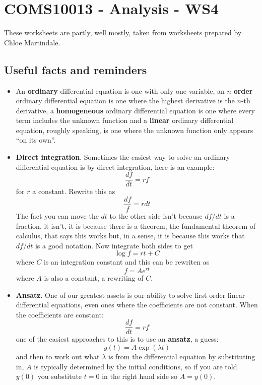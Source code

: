 \documentclass[11pt,a4paper]{scrartcl}
\begin{document}
\section*{COMS10013 - Analysis - WS4}

These worksheets are partly, well mostly, taken from worksheets prepared by Chloe Martindale.

\subsection*{Useful facts and reminders}

\begin{itemize}
\item An \textbf{ordinary} differential equation is one with only one variable,
  an $n$-\textbf{order} ordinary differential equation is one where the highest
  derivative is the $n$-th derivative, a \textbf{homogeneous} ordinary
  differential equation is one where every term includes the unknown
  function and a \textbf{linear} ordinary differential equation, roughly
  speaking, is one where the unknown function only appears ``on its
  own''.
\item \textbf{Direct integration}. Sometimes the easiest way to solve an ordinary differential equation is by direct integration, here is an example:
  \begin{equation}
    \frac{df}{dt}=rf
  \end{equation}
  for $r$ a constant. Rewrite this as
  \begin{equation}
    \frac{df}{f}=rdt
  \end{equation}
  The fact you can move the $dt$ to the other side isn't because $df/dt$ is a fraction, it isn't, it is because there is a theorem, the fundamental theorem of calculus, that says this works but, in a sense, it is because this works that $df/dt$ is a good notation. Now integrate both sides to get
  \begin{equation}
    \log{f}=rt+C
  \end{equation}
  where $C$ is an integration constant and this can be rewriten as
  \begin{equation}
    f=Ae^{rt}
  \end{equation}
  where $A$ is also a constant, a rewriting of $C$.

  
\item \textbf{Ansatz}. One of our greatest assets is our ability to solve first order
  linear differential equations, even ones where the coefficients are
  not constant. When the coefficients are constant:
  \begin{equation}
    \frac{df}{dt}=rf
  \end{equation}
  one of the easiest approaches to this is to use an
  \textbf{ansatz}, a guess:
  \begin{equation}
    y(t)=A\exp{(\lambda{}t)}
  \end{equation}
  and then to work out what $\lambda$ is from the differential
  equation by substituting in, $A$ is typically determined by the
  initial conditions, so if you are told $y(0)$ you substitute $t=0$ in the right hand side so $A=y(0)$.
  

\end{itemize}
\end{document}
